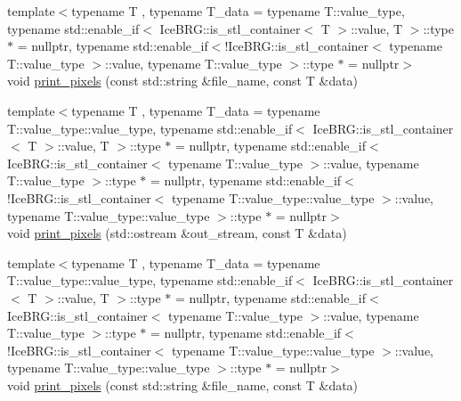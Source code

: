 \begin{DoxyCompactItemize}
\item 
{\footnotesize template$<$typename T , typename T\+\_\+data  = typename T\+::value\+\_\+type, typename std\+::enable\+\_\+if$<$ Ice\+B\+R\+G\+::is\+\_\+stl\+\_\+container$<$ T $>$\+::value, T $>$\+::type $\ast$  = nullptr, typename std\+::enable\+\_\+if$<$!\+Ice\+B\+R\+G\+::is\+\_\+stl\+\_\+container$<$ typename T\+::value\+\_\+type $>$\+::value, typename T\+::value\+\_\+type $>$\+::type $\ast$  = nullptr$>$ }\\void \hyperlink{namespaceIceBRG_ac6dc2cd6e8dd4c94975f19c502decb62}{print\+\_\+pixels} (const std\+::string \&file\+\_\+name, const T \&data)
\item 
{\footnotesize template$<$typename T , typename T\+\_\+data  = typename T\+::value\+\_\+type\+::value\+\_\+type, typename std\+::enable\+\_\+if$<$ Ice\+B\+R\+G\+::is\+\_\+stl\+\_\+container$<$ T $>$\+::value, T $>$\+::type $\ast$  = nullptr, typename std\+::enable\+\_\+if$<$ Ice\+B\+R\+G\+::is\+\_\+stl\+\_\+container$<$ typename T\+::value\+\_\+type $>$\+::value, typename T\+::value\+\_\+type $>$\+::type $\ast$  = nullptr, typename std\+::enable\+\_\+if$<$!\+Ice\+B\+R\+G\+::is\+\_\+stl\+\_\+container$<$ typename T\+::value\+\_\+type\+::value\+\_\+type $>$\+::value, typename T\+::value\+\_\+type\+::value\+\_\+type $>$\+::type $\ast$  = nullptr$>$ }\\void \hyperlink{namespaceIceBRG_a6f81451b445822cf2de4e3e9063e2784}{print\+\_\+pixels} (std\+::ostream \&out\+\_\+stream, const T \&data)
\item 
{\footnotesize template$<$typename T , typename T\+\_\+data  = typename T\+::value\+\_\+type\+::value\+\_\+type, typename std\+::enable\+\_\+if$<$ Ice\+B\+R\+G\+::is\+\_\+stl\+\_\+container$<$ T $>$\+::value, T $>$\+::type $\ast$  = nullptr, typename std\+::enable\+\_\+if$<$ Ice\+B\+R\+G\+::is\+\_\+stl\+\_\+container$<$ typename T\+::value\+\_\+type $>$\+::value, typename T\+::value\+\_\+type $>$\+::type $\ast$  = nullptr, typename std\+::enable\+\_\+if$<$!\+Ice\+B\+R\+G\+::is\+\_\+stl\+\_\+container$<$ typename T\+::value\+\_\+type\+::value\+\_\+type $>$\+::value, typename T\+::value\+\_\+type\+::value\+\_\+type $>$\+::type $\ast$  = nullptr$>$ }\\void \hyperlink{namespaceIceBRG_a4f163d09ba4f5ab10a90f0ef68af2759}{print\+\_\+pixels} (const std\+::string \&file\+\_\+name, const T \&data)
\item 

\end{DoxyCompactItemize}
